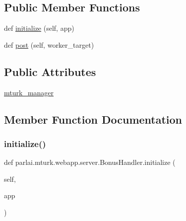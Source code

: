 \subsection*{Public Member Functions}
\begin{DoxyCompactItemize}
\item 
def \hyperlink{classparlai_1_1mturk_1_1webapp_1_1server_1_1BonusHandler_aa29383ea72a9d3e93e75a0689bc6db1e}{initialize} (self, app)
\item 
def \hyperlink{classparlai_1_1mturk_1_1webapp_1_1server_1_1BonusHandler_acdeaf6529109287285903ed8babe864c}{post} (self, worker\+\_\+target)
\end{DoxyCompactItemize}
\subsection*{Public Attributes}
\begin{DoxyCompactItemize}
\item 
\hyperlink{classparlai_1_1mturk_1_1webapp_1_1server_1_1BonusHandler_a9cfd41f9f9ca83eae4d3f8d5f54b8d03}{mturk\+\_\+manager}
\end{DoxyCompactItemize}


\subsection{Member Function Documentation}
\mbox{\label{classparlai_1_1mturk_1_1webapp_1_1server_1_1BonusHandler_aa29383ea72a9d3e93e75a0689bc6db1e}} 
\subsubsection{\texorpdfstring{initialize()}{initialize()}}
{\footnotesize\ttfamily def parlai.\+mturk.\+webapp.\+server.\+Bonus\+Handler.\+initialize (\begin{DoxyParamCaption}\item[{}]{self,  }\item[{}]{app }\end{DoxyParamCaption})}

\mbox{\label{classparlai_1_1mturk_1_1webapp_1_1server_1_1BonusHandler_acdeaf6529109287285903ed8babe864c}} 
